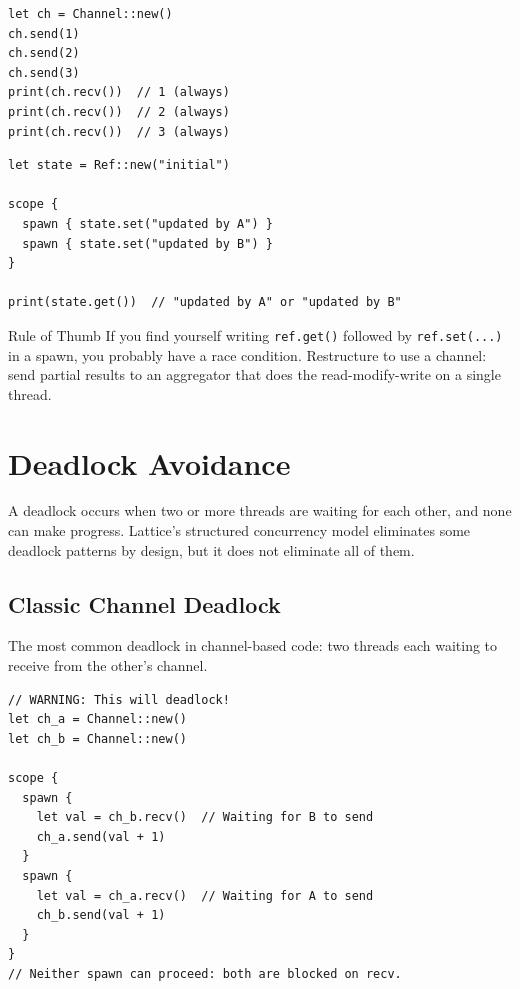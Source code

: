 \begin{lstlisting}[language=Lattice, caption={Channel: ordered, exactly-once delivery}]
let ch = Channel::new()
ch.send(1)
ch.send(2)
ch.send(3)
print(ch.recv())  // 1 (always)
print(ch.recv())  // 2 (always)
print(ch.recv())  // 3 (always)
\end{lstlisting}

\begin{lstlisting}[language=Lattice, caption={Ref: latest-value semantics}]
let state = Ref::new("initial")

scope {
  spawn { state.set("updated by A") }
  spawn { state.set("updated by B") }
}

print(state.get())  // "updated by A" or "updated by B"
\end{lstlisting}

\begin{tipbox}{Rule of Thumb}
If you find yourself writing \lstinline|ref.get()| followed by \lstinline|ref.set(...)| in a spawn, you probably have a race condition.
Restructure to use a channel: send partial results to an aggregator that does the read-modify-write on a single thread.
\end{tipbox}

\section{Deadlock Avoidance}\label{sec:deadlock-avoidance}


A deadlock occurs when two or more threads are waiting for each other, and none can make progress.
Lattice's structured concurrency model eliminates some deadlock patterns by design, but it does not eliminate all of them.

\subsection{Classic Channel Deadlock}

The most common deadlock in channel-based code: two threads each waiting to receive from the other's channel.

\begin{lstlisting}[language=Lattice, caption={Deadlock: circular recv}]
// WARNING: This will deadlock!
let ch_a = Channel::new()
let ch_b = Channel::new()

scope {
  spawn {
    let val = ch_b.recv()  // Waiting for B to send
    ch_a.send(val + 1)
  }
  spawn {
    let val = ch_a.recv()  // Waiting for A to send
    ch_b.send(val + 1)
  }
}
// Neither spawn can proceed: both are blocked on recv.
\end{lstlisting}

